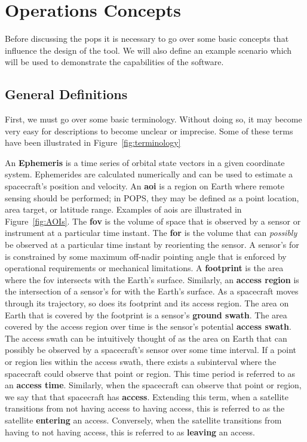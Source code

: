 \glsresetall{} 
\chapter{Operations Concepts}\label{chap:ops}

\lettrine[lines=2, findent=0pt, nindent=5pt]{B}{}efore discussing the
\gls{pops} it is necessary to go over some basic concepts that influence the
design of the tool. We will also define an example scenario which will be used
to demonstrate the capabilities of the software.

\section{General Definitions}

First, we must go over some basic terminology.  Without doing so, it may become very easy for descriptions
to become unclear or imprecise. Some of these terms have been illustrated in
Figure~\ref{fig:terminology}

An \textbf{Ephemeris} is a time series of orbital state vectors in a given
coordinate system. Ephemerides are calculated numerically and can be used to
estimate a spacecraft’s position and velocity.  An \textbf{\gls{aoi}} is a
region on Earth where remote sensing should be performed; in POPS, they may be
defined as a point location, area target, or latitude range.  Examples of
\glspl{aoi} are illustrated in Figure~\ref{fig:AOIs}. The \textbf{\gls{fov}} is
the volume of space that is observed by a sensor or instrument at a particular
time instant.  The \textbf{\gls{for}} is the volume that can \textit{possibly}
be observed at a particular time instant by reorienting the sensor. A sensor’s
\gls{for} is constrained by some maximum off-nadir pointing angle that is
enforced by operational requirements or mechanical limitations. A
\textbf{footprint} is the area where the \gls{fov} intersects with the Earth’s
surface.  Similarly, an \textbf{access region} is the intersection of a
sensor’s \gls{for} with the Earth’s surface.  As a spacecraft moves through its
trajectory, so does its footprint and its access region.  The area on Earth
that is covered by the footprint is a sensor’s \textbf{ground swath}. The area
covered by the access region over time is the sensor’s potential \textbf{access
swath}.  The access swath can be intuitively thought of as the area on Earth
that can possibly be observed by a spacecraft’s sensor over some time interval.
If a point or region lies within the access swath, there exists a subinterval
where the spacecraft could observe that point or region. This time period is
referred to as an \textbf{access time}. Similarly, when the spacecraft can
observe that point or region, we say that that spacecraft has \textbf{access}.
Extending this term, when a satellite transitions from not having access to
having access, this is referred to as the satellite \textbf{entering} an
access. Conversely, when the satellite transitions from having to not having
access, this is referred to as \textbf{leaving} an access. 

